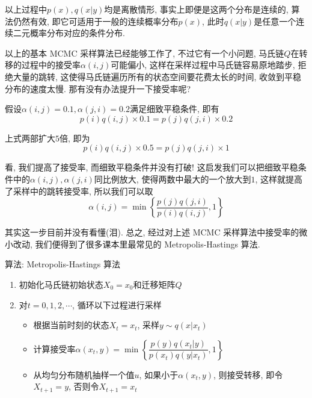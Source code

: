 \documentclass[a4paper,UTF8]{ctexart}
\theoremstyle{plain} \newtheorem{theorem}{定理}[section]
\theoremstyle{plain} \newtheorem{definition}{定义}[section]
\theoremstyle{plain} \newtheorem{lemma}{引理}[section]
\theoremstyle{plain} \newtheorem{proposition}{命题}[section]
\theoremstyle{plain} \newtheorem{example}{例}[section]
\theoremstyle{plain} \newtheorem{remark}{注}[section]
\theoremstyle{plain} \newtheorem{corollary}{推论}[section]
\begin{document}
以上过程中$p(x), q(x | y)$均是离散情形, 事实上即便是这两个分布是连续的, 算法仍然有效, 即它可适用于一般的连续概率分布$p(x)$, 此时$q(x | y)$是任意一个连续二元概率分布对应的条件分布.

以上的基本 MCMC 采样算法已经能够工作了, 不过它有一个小问题, 马氏链$Q$在转移的过程中的接受率$\alpha(i,j)$可能偏小, 这样在采样过程中马氏链容易原地踏步, 拒绝大量的跳转, 这使得马氏链遍历所有的状态空间要花费太长的时间, 收敛到平稳分布的速度太慢. 那有没有办法提升一下接受率呢?

假设$\alpha(i,j) = 0.1, \alpha(j,i) = 0.2$满足细致平稳条件, 即有
\begin{equation*}
p(i) q(i,j) \times 0.1 = p(j) q(j,i) \times 0.2
\end{equation*}

上式两部扩大$5$倍, 即为
\begin{equation*}
p(i) q(i,j) \times 0.5 = p(j) q(j,i) \times 1
\end{equation*}

看, 我们提高了接受率, 而细致平稳条件并没有打破! 这启发我们可以把细致平稳条件中的$\alpha(i,j), \alpha(j,i)$同比例放大, 使得两数中最大的一个放大到$1$, 这样就提高了采样中的跳转接受率, 所以我们可以取
\begin{equation*}
\alpha(i,j) = \min \left\{ \frac{p(j) q(j,i)}{p(i) q(i,j)}, 1 \right\}
\end{equation*}

其实这一步目前并没有看懂(泪). 总之, 经过对上述 MCMC 采样算法中接受率的微小改动, 我们便得到了很多课本里最常见的 Metropolis-Hastings 算法.

\begin{algorithm}[htb]
\caption{算法: Metropolis-Hastings 算法}

\begin{enumerate}[1.]
\item 初始化马氏链初始状态$X_0 = x_0$和迁移矩阵$Q$ 

\item 对$t = 0,1,2,\cdots$, 循环以下过程进行采样
\begin{itemize}
    \item  根据当前时刻的状态$X_t = x_t$, 采样$y \sim q(x | x_t)$

    \item 计算接受率$\alpha(x_t, y) = \min \left\{ \dfrac{p(y) q(x_t | y)}{p(x_t) q(y | x_t)}, 1 \right\}$

    \item 从均匀分布随机抽样一个值$u$, 如果小于$\alpha(x_t, y)$, 则接受转移, 即令$X_{t+1} = y$, 否则令$X_{t+1} = x_t$
\end{itemize}
\end{enumerate}

\end{algorithm}
\end{document}
